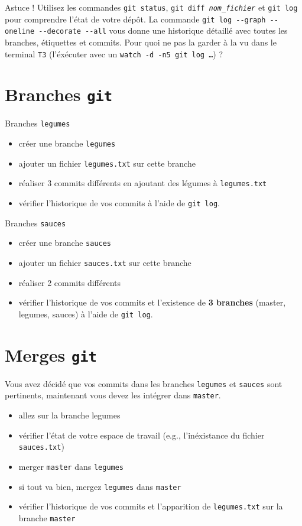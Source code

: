 \documentclass[final, a4paper, openbib, ]{article}
\begin{document}
\begin{alertinfo3}{Astuce !}
Utilisez les commandes \texttt{git status}, \texttt{git diff \textit{nom\_fichier}} et \texttt{git log} pour comprendre l'état de votre dépôt. La commande \texttt{git log -}\texttt{-graph -}\texttt{-oneline -}\texttt{-decorate -}\texttt{-all} vous donne une historique détaillé avec toutes les branches, étiquettes et commits.
Pour quoi ne pas la garder à la vu dans le terminal \texttt{T3} (l'éxécuter avec un \texttt{watch -d -n5 git log \ldots}) ?
\end{alertinfo3}


\section{Branches \texttt{git}}

Branches \texttt{legumes}
\begin{itemize}
\item créer une branche \texttt{legumes}
\item ajouter un fichier \texttt{legumes.txt} sur cette branche
\item réaliser 3 commits différents en ajoutant des légumes à \texttt{legumes.txt}
\item vérifier l'historique de vos commits à l'aide de \texttt{git log}.
\end{itemize}

Branches \texttt{sauces}
\begin{itemize}
\item créer une branche \texttt{sauces}
\item ajouter un fichier \texttt{sauces.txt} sur cette branche
\item réaliser 2 commits différents
\item vérifier l'historique de vos commits et l'existence de \textbf{3 branches} (master, legumes, sauces) à l'aide de \texttt{git log}.
\end{itemize}

\section{Merges \texttt{git}}
Vous avez décidé que vos commits dans les branches \texttt{legumes} et \texttt{sauces} sont pertinents, maintenant vous devez les intégrer dans \texttt{master}.
\begin{itemize}
\item allez sur la branche legumes
\item vérifier l'état de votre espace de travail (e.g., l'inéxistance du fichier \texttt{sauces.txt})
\item merger \texttt{master} dans \texttt{legumes}
\item si tout va bien, mergez \texttt{legumes} dans \texttt{master}
\item vérifier l'historique de vos commits et l'apparition de \texttt{legumes.txt} sur la branche \texttt{master}\\
\end{itemize}
\end{document}
